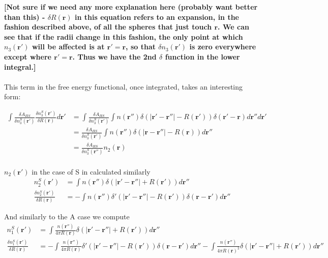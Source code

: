 \documentclass[letterpaper,twocolumn,amsmath,amssymb,jcp,10pt,aip]{revtex4-1}
\newcommand{\red}[1]{{\bf \color{red} #1}}
\newcommand{\fixme}[1]{\red{[#1]}}
\begin{document}
\begin{widetext}
\fixme{Not sure if we need any more explanation here (probably want better than this) -  $\delta R(\mathbf{r})$ in this equation refers to an expansion, in the fashion described above, of all the spheres that just touch $\mathbf{r}$.  We can see that if the radii change in this fashion, the only point at which $n_3(\mathbf{r}')$ will be affected is at $\mathbf{r}' = \mathbf{r}$, so that $\delta n_3(\mathbf{r}')$ is zero everywhere except where $\mathbf{r}' = \mathbf{r}$.  Thus we have the 2nd $\delta$ function in the lower integral.}
\\
\\
This term in the free energy functional, once integrated, takes an interesting form:  

\begin{align}
  \int \frac{\delta A_{HS}}{\delta n_3^{S}(\mathbf{r}')} 
  \frac{\delta n_3^{S}(\mathbf{r}')}{\delta R(\mathbf{r})} d\mathbf{r}' 
  &= \int \frac{\delta A_{HS}}{\delta n_3^{S}(\mathbf{r}')} \int n (\mathbf{r}'') \delta(|\mathbf{r}' - \mathbf{r}''| - R(\mathbf{r}')) \delta(\mathbf{r}'-\mathbf{r}) d\mathbf{r}'' d\mathbf{r}' \\
  &= \frac{\delta A_{HS}}{\delta n_3^{S}(\mathbf{r}')} \int n (\mathbf{r}'') \delta(|\mathbf{r} - \mathbf{r}''| - R(\mathbf{r})) d\mathbf{r}''\\
  &= \frac{\delta A_{HS}}{\delta n_3^{S}(\mathbf{r}'')} n_2(\mathbf{r})\\
\end{align}
  
 $n_2(\mathbf{r}')$ in the case of S in calculated similarly
\begin{align}
  n_2^{S}(\mathbf{r}') &= \int n(\mathbf{r}'') \delta(|\mathbf{r}' - \mathbf{r}''| + R(\mathbf{r}'))d\mathbf r''\\
    \frac{\delta n_2^{S}(\mathbf{r}')}{\delta R(\mathbf{r})} &= -\int n(\mathbf{r}'') 
  \delta'(|\mathbf{r}'-\mathbf{r}''| - R(\mathbf{r}')) \delta(\mathbf{r}-\mathbf{r}') d\mathbf{r}''
\end{align}

And similarly to the A case we compute
\begin{align}
  n_1^{S}(\mathbf{r}') &= \int \frac{n(\mathbf{r}'')}{4\pi R(\mathbf{r})} \delta(|\mathbf{r}' - \mathbf{r}''| + R(\mathbf{r}'))d\mathbf r''\\
    \frac{\delta n_1^{S}(\mathbf{r}')}{\delta R(\mathbf{r})} &= -\int \frac{n(\mathbf{r}'')}{4\pi R(\mathbf{r})} 
  \delta'(|\mathbf{r}'-\mathbf{r}''| - R(\mathbf{r}')) \delta(\mathbf{r}-\mathbf{r}') d\mathbf{r}'' 
  -
  \int \frac{n(\mathbf{r}'')}{4\pi R(\mathbf{r})^2} \delta(|\mathbf{r}' - \mathbf{r}''| + R(\mathbf{r}'))d\mathbf r''
\end{align}


\end{widetext}
\end{document}

